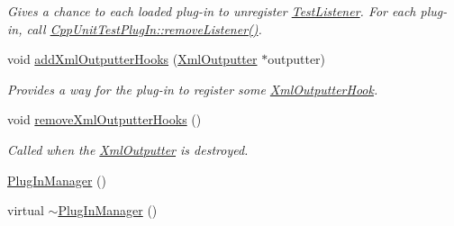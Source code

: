 \begin{DoxyCompactItemize}
\begin{DoxyCompactList}\small\item\em Gives a chance to each loaded plug-\/in to unregister \hyperlink{class_test_listener}{Test\+Listener}. For each plug-\/in, call \hyperlink{struct_cpp_unit_test_plug_in_a8f36157014b515d38efbc8ab67923d85}{Cpp\+Unit\+Test\+Plug\+In\+::remove\+Listener()}. \end{DoxyCompactList}\item 
\hypertarget{class_plug_in_manager_a4a9c64e0ac3f762b100b993d7e33f889}{void \hyperlink{class_plug_in_manager_a4a9c64e0ac3f762b100b993d7e33f889}{add\+Xml\+Outputter\+Hooks} (\hyperlink{class_xml_outputter}{Xml\+Outputter} $\ast$outputter)}\label{class_plug_in_manager_a4a9c64e0ac3f762b100b993d7e33f889}

\begin{DoxyCompactList}\small\item\em Provides a way for the plug-\/in to register some \hyperlink{class_xml_outputter_hook}{Xml\+Outputter\+Hook}. \end{DoxyCompactList}\item 
void \hyperlink{class_plug_in_manager_a0fe59f82fd430ea57159a6ffad9a4035}{remove\+Xml\+Outputter\+Hooks} ()
\begin{DoxyCompactList}\small\item\em Called when the \hyperlink{class_xml_outputter}{Xml\+Outputter} is destroyed. \end{DoxyCompactList}\item 
\hyperlink{class_plug_in_manager_a7789a7e258e750bd14267d20cac7d288}{Plug\+In\+Manager} ()
\item 
\hypertarget{class_plug_in_manager_a093797f2d979b22fcf8df2230985b246}{virtual \hyperlink{class_plug_in_manager_a093797f2d979b22fcf8df2230985b246}{$\sim$\+Plug\+In\+Manager} ()}\label{class_plug_in_manager_a093797f2d979b22fcf8df2230985b246}


\end{DoxyCompactItemize}
